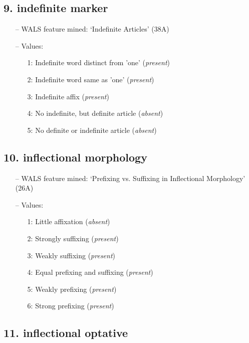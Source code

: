 \subsection*{9. indefinite marker}

\begin{itemize}
\item[--] WALS feature mined: `Indefinite Articles' (38A)
\item[--] Values:

\begin{enumerate}
\item[1:] Indefinite word distinct from 'one' (\emph{present})
\item[2:] Indefinite word same as 'one' (\emph{present})
\item[3:] Indefinite affix (\emph{present})
\item[4:] No indefinite, but definite article (\emph{absent})
\item[5:] No definite or indefinite article (\emph{absent})
\end{enumerate}
\end{itemize}

\subsection*{10. inflectional morphology}

\begin{itemize}
\item[--] WALS feature mined: `Prefixing vs. Suffixing in Inflectional Morphology' (26A)
\item[--] Values:

\begin{enumerate}
\item[1:] Little affixation (\emph{absent})
\item[2:] Strongly suffixing (\emph{present})
\item[3:] Weakly suffixing (\emph{present})
\item[4:] Equal prefixing and suffixing (\emph{present})
\item[5:] Weakly prefixing (\emph{present})
\item[6:] Strong prefixing (\emph{present})
\end{enumerate}
\end{itemize}

\subsection*{11. inflectional optative}

